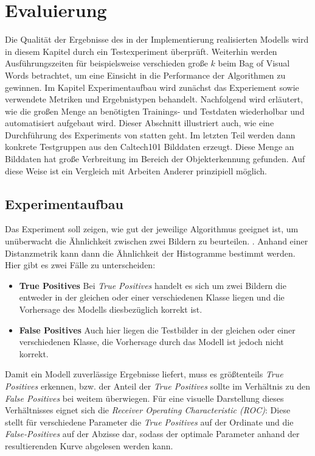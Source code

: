 \chapter{Evaluierung}

Die Qualität der Ergebnisse des in der Implementierung realisierten Modells wird in diesem Kapitel durch ein Testexperiment überprüft. Weiterhin werden Ausführungszeiten für beispielsweise verschieden große $k$ beim Bag of Visual Words betrachtet, um eine Einsicht in die Performance der Algorithmen zu gewinnen.
Im Kapitel Experimentaufbau wird zunächst das Experiement sowie verwendete Metriken und Ergebnistypen behandelt. Nachfolgend wird erläutert, wie die großen Menge an benötigten Trainings- und Testdaten wiederholbar und automatisiert aufgebaut wird. Dieser Abschnitt illustriert auch, wie eine Durchführung des Experiments von statten geht. Im letzten Teil werden dann konkrete Testgruppen aus den Caltech101 \cite{cal2004} Bilddaten erzeugt. Diese Menge an Bilddaten hat große Verbreitung im Bereich der Objekterkennung gefunden. Auf diese Weise ist ein Vergleich mit Arbeiten Anderer prinzipiell möglich.

\section{Experimentaufbau}

Das Experiment soll zeigen, wie gut der jeweilige Algorithmus geeignet ist, um unüberwacht die Ähnlichkeit zwischen zwei Bildern zu beurteilen. . Anhand einer Distanzmetrik kann dann die Ähnlichkeit der Histogramme bestimmt werden. Hier gibt es zwei Fälle zu unterscheiden:

\begin{itemize}
	\item \textbf{True Positives} Bei \textit{True Positives} handelt es sich um zwei Bildern die entweder in der gleichen oder einer verschiedenen Klasse liegen und die Vorhersage des Modells diesbezüglich korrekt ist.
	\item \textbf{False Positives} Auch hier liegen die Testbilder in der gleichen oder einer verschiedenen Klasse, die Vorhersage durch das Modell ist jedoch nicht korrekt.
\end{itemize}

Damit ein Modell zuverlässige Ergebnisse liefert, muss es größtenteils \textit{True Positives} erkennen, bzw. der Anteil der \textit{True Positives} sollte im Verhältnis zu den \textit{False Positives} bei weitem überwiegen. Für eine visuelle Darstellung dieses Verhältnisses eignet sich die \textit{Receiver Operating Characteristic (ROC)}: Diese stellt für verschiedene Parameter die \textit{True Positives} auf der Ordinate und die \textit{False-Positives} auf der Abzisse dar, sodass der optimale Parameter anhand der resultierenden Kurve abgelesen werden kann.

